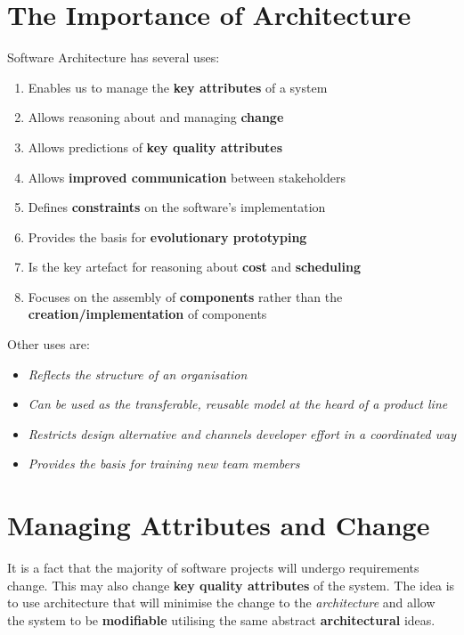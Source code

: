 \documentclass[a4paper]{report}
\begin{document}
\section{The Importance of Architecture}
Software Architecture has several uses:
\begin{enumerate}
\item Enables us to manage the \textbf{key attributes} of a system
\item Allows reasoning about and managing \textbf{change}
\item Allows predictions of \textbf{key quality attributes}
\item Allows \textbf{improved communication} between stakeholders
\item Defines \textbf{constraints} on the software's implementation
\item Provides the basis for \textbf{evolutionary prototyping}
\item Is the key artefact for reasoning about \textbf{cost} and \textbf{scheduling}
\item Focuses on the assembly of \textbf{components} rather than the \textbf{creation/implementation} of components\\
\end{enumerate}

Other uses are:
\begin{itemize}
\item \textit{Reflects the structure of an organisation}
\item \textit{Can be used as the transferable, reusable model at the heard of a product line}
\item \textit{Restricts design alternative and channels developer effort in a coordinated way}
\item \textit{Provides the basis for training new team members}
\end{itemize}

\section{Managing Attributes and Change}
It is a fact that the majority of software projects will undergo requirements change. This may also change \textbf{key quality attributes} of the system. The idea is to use architecture that will minimise the change to the \textit{architecture} and allow the system to be \textbf{modifiable} utilising the same abstract \textbf{architectural} ideas.\\
\end{document}
